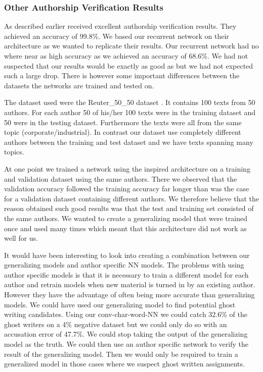 \subsubsection{Other Authorship Verification Results}
\label{subsubsec:other_authorship_verification_results}

As described earlier \citet{qian:2018} received excellent authorship
verification results. They achieved an accuracy of 99.8\%. We based our
recurrent network on their architecture as we wanted to replicate their results.
Our recurrent network had no where near as high accuracy as we achieved an
accuracy of 68.6\%. We had not suspected that our results would be exactly as
good as \citet{qian:2018} but we had not expected such a large drop. There is
however some important differences between the datasets the networks are trained
and tested on.

The dataset \citet{qian:2018} used were the Reuter\_50\_50 dataset
\citep{Dua:2017}. It contains 100 texts from 50 authors. For each author
50 of his/her 100 texts were in the training dataset and 50 were in the
testing dataset. Furthermore the texts were all from the same topic
(corporate/industrial). In contrast our dataset use completely different authors
between the training and test dataset and we have texts spanning many topics.


At one point we trained a network using the \citet{qian:2018} inspired
architecture on a training and validation dataset using the same authors. There
we observed that the validation accuracy followed the training accuracy far
longer than was the case for a validation dataset containing different authors.
We therefore believe that the reason \citet{qian:2018} obtained such good
results was that the test and training set consisted of the same authors. We
wanted to create a generalizing model that were trained once and used many times
which meant that this architecture did not work as well for us.

It would have been interesting to look into creating a combination between our
generalizing models and author specific \gls{NN} models. The problems with
using author specific models is that it is necessary to train a different
model for each author and retrain models when new material is turned in by an
existing author. However they have the advantage of often being more accurate
than generalizing models. We could have used our generalizing model to find
potential ghost writing candidates. Using our \gls{conv-char-word-NN} we could
catch 32.6\% of the ghost writers on a 4\% negative dataset but we could only do
so with an accusation error of 47.7\%. We could stop taking the output of the
generalizing model as the truth. We could then use an author specific network
to verify the result of the generalizing model. Then we would only be required
to train a generalized model in those cases where we suspect ghost written
assignments.


